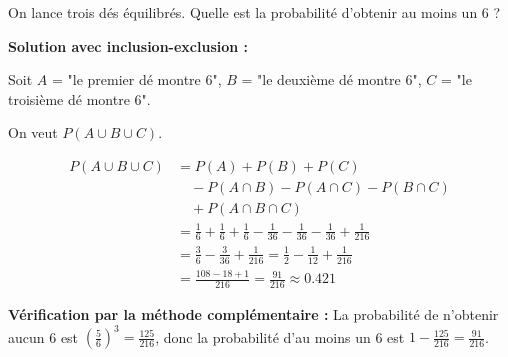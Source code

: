 \begin{examplebox}
On lance trois dés équilibrés. Quelle est la probabilité d'obtenir au moins un 6 ?

\vspace{0.3cm}
\noindent\textbf{Solution avec inclusion-exclusion :}

Soit $A$ = "le premier dé montre 6", $B$ = "le deuxième dé montre 6", $C$ = "le troisième dé montre 6".

On veut $P(A \cup B \cup C)$.

\begin{align*}
P(A \cup B \cup C) &= P(A) + P(B) + P(C) \\
&\quad - P(A \cap B) - P(A \cap C) - P(B \cap C) \\
&\quad + P(A \cap B \cap C) \\
&= \frac{1}{6} + \frac{1}{6} + \frac{1}{6} - \frac{1}{36} - \frac{1}{36} - \frac{1}{36} + \frac{1}{216} \\
&= \frac{3}{6} - \frac{3}{36} + \frac{1}{216} = \frac{1}{2} - \frac{1}{12} + \frac{1}{216} \\
&= \frac{108 - 18 + 1}{216} = \frac{91}{216} \approx 0.421
\end{align*}

\vspace{0.3cm}
\noindent\textbf{Vérification par la méthode complémentaire :}
La probabilité de n'obtenir aucun 6 est $\left(\frac{5}{6}\right)^3 = \frac{125}{216}$, donc la probabilité d'au moins un 6 est $1 - \frac{125}{216} = \frac{91}{216}$.
\end{examplebox}